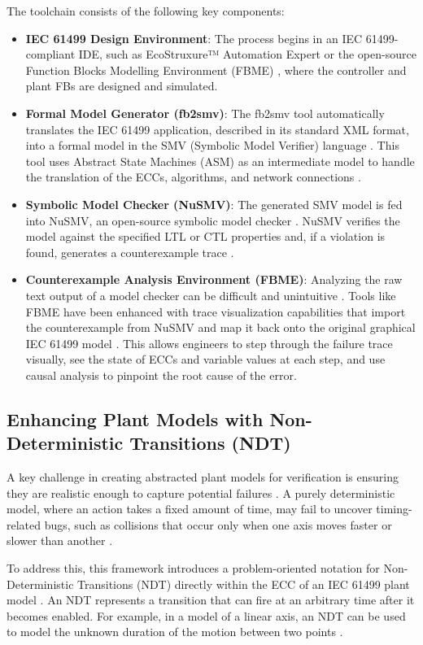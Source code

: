 The toolchain consists of the following key components:

\begin{itemize}
\item \textbf{IEC 61499 Design Environment}: The process begins in an IEC 61499-compliant IDE, such as EcoStruxure™ Automation Expert or the open-source Function Blocks Modelling Environment (FBME) , where the controller and plant FBs are designed and simulated.

\item \textbf{Formal Model Generator (fb2smv)}: The fb2smv tool automatically translates the IEC 61499 application, described in its standard XML format, into a formal model in the SMV (Symbolic Model Verifier) language . This tool uses Abstract State Machines (ASM) as an intermediate model to handle the translation of the ECCs, algorithms, and network connections .

\item \textbf{Symbolic Model Checker (NuSMV)}: The generated SMV model is fed into NuSMV, an open-source symbolic model checker . NuSMV verifies the model against the specified LTL or CTL properties and, if a violation is found, generates a counterexample trace .

\item \textbf{Counterexample Analysis Environment (FBME)}: Analyzing the raw text output of a model checker can be difficult and unintuitive . Tools like FBME have been enhanced with trace visualization capabilities that import the counterexample from NuSMV and map it back onto the original graphical IEC 61499 model . This allows engineers to step through the failure trace visually, see the state of ECCs and variable values at each step, and use causal analysis to pinpoint the root cause of the error.
\end{itemize}

\subsection{Enhancing Plant Models with Non-Deterministic Transitions (NDT)}

A key challenge in creating abstracted plant models for verification is ensuring they are realistic enough to capture potential failures . A purely deterministic model, where an action takes a fixed amount of time, may fail to uncover timing-related bugs, such as collisions that occur only when one axis moves faster or slower than another .

To address this, this framework introduces a problem-oriented notation for Non-Deterministic Transitions (NDT) directly within the ECC of an IEC 61499 plant model . An NDT represents a transition that can fire at an arbitrary time after it becomes enabled. For example, in a model of a linear axis, an NDT can be used to model the unknown duration of the motion between two points .

